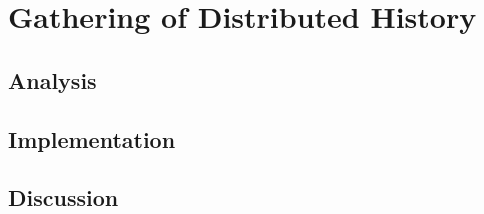 \chapter{Gathering of Distributed History}
	\section{Analysis} %
	\section{Implementation} %
	\section{Discussion} %